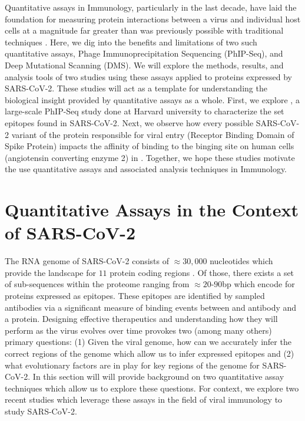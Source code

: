 \documentclass{article}
\begin{document}
Quantitative assays in Immunology, particularly in the last decade, have laid the foundation for measuring protein interactions between a virus and individual host cells at a magnitude far greater than was previously possible with traditional techniques \citep{Fowler2014, Bloom2014}.
Here, we dig into the benefits and limitations of two such quantitative assays, Phage Immunoprecipitation Sequencing (PhIP-Seq), and Deep Mutational Scanning (DMS).
We will explore the methods, results, and analysis tools of two studies using these assays applied to proteins expressed by SARS-CoV-2.
These studies will act as a template for understanding the biological insight provided by quantitative assays as a whole.
First, we explore \citet{Shrock2020}, a large-scale PhIP-Seq study done at Harvard university to characterize the set epitopes found in SARS-CoV-2.
Next, we observe how every possible SARS-CoV-2 variant of the protein responsible for viral entry (Receptor Binding Domain of Spike Protein) impacts the affinity of binding to the binging site on human cells (angiotensin converting enzyme 2) in \cite{Starr2020}.
Together, we hope these studies motivate the use quantitative assays and associated analysis techniques in Immunology.

\section*{Quantitative Assays in the Context of SARS-CoV-2}

The RNA genome of SARS-CoV-2 consists of $\approx 30,000$ nucleotides which provide the landscape for $11$ protein coding regions \citep{Naqvi2020}.
Of those, there exists a set of sub-sequences within the proteome ranging from $\approx 20$-$90$bp which encode for proteins expressed as epitopes. 
These epitopes are identified by sampled antibodies via a significant measure of binding events between and antibody and a protein.
Designing effective therapeutics and understanding how they will perform as the virus evolves over time provokes two (among many others) primary questions:
(1) Given the viral genome, how can we accurately infer the correct regions of the genome which allow us to infer expressed epitopes and
(2) what evolutionary factors are in play for key regions of the genome for SARS-CoV-2.
In this section will will provide background on two quantitative assay techniques which allow us to explore these questions.
For context, we explore two recent studies which leverage these assays in the field of viral immunology to study SARS-CoV-2.
\end{document}
